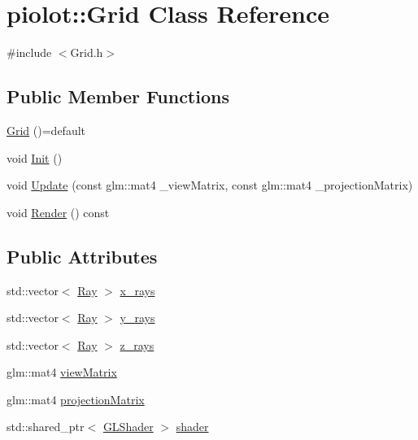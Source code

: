 \hypertarget{classpiolot_1_1_grid}{}\section{piolot\+:\+:Grid Class Reference}
\label{classpiolot_1_1_grid}


{\ttfamily \#include $<$Grid.\+h$>$}

\subsection*{Public Member Functions}
\begin{DoxyCompactItemize}
\item 
\mbox{\hyperlink{classpiolot_1_1_grid_ab43feb8d7b505cf880c6d328aabe1adf}{Grid}} ()=default
\item 
void \mbox{\hyperlink{classpiolot_1_1_grid_acde85bc00911a143d9407a814e1d6d88}{Init}} ()
\item 
void \mbox{\hyperlink{classpiolot_1_1_grid_a3af0ba487e81a5d616788cd5f4ecbd11}{Update}} (const glm\+::mat4 \+\_\+view\+Matrix, const glm\+::mat4 \+\_\+projection\+Matrix)
\item 
void \mbox{\hyperlink{classpiolot_1_1_grid_a36c9dfed35987b298ca3bf4ff3cb06a8}{Render}} () const
\end{DoxyCompactItemize}
\subsection*{Public Attributes}
\begin{DoxyCompactItemize}
\item 
std\+::vector$<$ \mbox{\hyperlink{classpiolot_1_1_ray}{Ray}} $>$ \mbox{\hyperlink{classpiolot_1_1_grid_a09e5317cee1cd166c91363d608bde97d}{x\+\_\+rays}}
\item 
std\+::vector$<$ \mbox{\hyperlink{classpiolot_1_1_ray}{Ray}} $>$ \mbox{\hyperlink{classpiolot_1_1_grid_a8eaf3716e1f5623d15fa26cf1e8b2778}{y\+\_\+rays}}
\item 
std\+::vector$<$ \mbox{\hyperlink{classpiolot_1_1_ray}{Ray}} $>$ \mbox{\hyperlink{classpiolot_1_1_grid_a9407fb2aa26aae50604cd8d8197d3fb6}{z\+\_\+rays}}
\item 
glm\+::mat4 \mbox{\hyperlink{classpiolot_1_1_grid_acc61d6d0bc8d0b7cf77da8193f40433e}{view\+Matrix}}
\item 
glm\+::mat4 \mbox{\hyperlink{classpiolot_1_1_grid_ada577e74647a548fb07af5bd8597d6d8}{projection\+Matrix}}
\item 
std\+::shared\+\_\+ptr$<$ \mbox{\hyperlink{classpiolot_1_1_g_l_shader}{G\+L\+Shader}} $>$ \mbox{\hyperlink{classpiolot_1_1_grid_a3eaeeee54a7aef5807b8927b1ca2615e}{shader}}
\end{DoxyCompactItemize}


